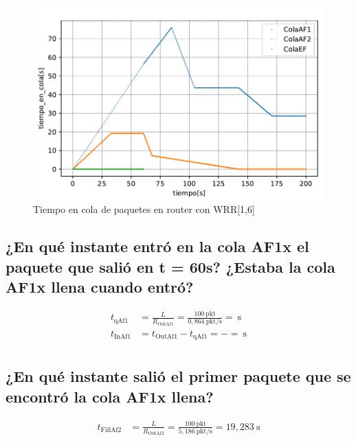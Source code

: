 \begin{figure}[!ht]
    \centering
    \includegraphics{graficas/WRR/tiempo_en_cola_wrr.pdf}
    \caption{Tiempo en cola de paquetes en router con WRR[1,6]}
    \label{fig:wrr16_time}
\end{figure}

\vspace{0,3cm}

\subsection{¿En qué instante entró en la cola AF1x el paquete que salió en t = 60s? ¿Estaba la cola AF1x llena cuando
entró?}
\[
    \begin{aligned}
        t_{\text{qAf1}} &= \frac{L}{R_{\text{OutAf1}}} = \frac{100~\text{pkt}}{0,864~\text{pkt/s}}= ~\text{s} \\
		t_{\text{InAf1}} &= t_{\text{OutAf1}} - t_{\text{qAf1}} = - = ~\text{s} \\
    \end{aligned}
\]

\vspace{0,3cm}

\subsection{¿En qué instante salió el primer paquete que se encontró la cola AF1x llena?}
\[
    \begin{aligned}
        t_{\text{FillAf2}} &= \frac{L}{R_{\text{OutAf2}}} = \frac{100~\text{pkt}}{5,186~\text{pkt/s}}= 19,283~\text{s} \\
    \end{aligned}
\]

